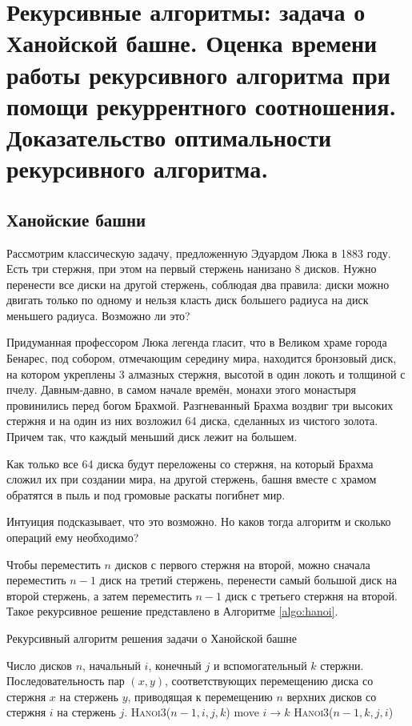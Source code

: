 \documentclass[a4paper,12pt]{article}
\begin{document}
\tableofcontents

\newpage

\section{Рекурсивные алгоритмы: задача о Ханойской башне. Оценка времени работы рекурсивного алгоритма при помощи рекуррентного соотношения. Доказательство оптимальности рекурсивного алгоритма.}

\subsection{Ханойские башни}
Рассмотрим классическую задачу, предложенную Эдуардом Люка в 1883 году. Есть три стержня, при этом на первый стержень нанизано 8 дисков. Нужно перенести все диски на другой стержень, соблюдая два правила: диски можно двигать только по одному и нельзя класть
диск большего радиуса на диск меньшего радиуса. Возможно ли это?

Придуманная профессором Люка легенда гласит, что в Великом храме города Бенарес, под собором, отмечающим середину мира, находится бронзовый диск, на котором укреплены 3 алмазных стержня, высотой в один локоть и толщиной с пчелу. Давным-давно, в самом начале времён, монахи этого монастыря провинились перед богом Брахмой. Разгневанный Брахма воздвиг три высоких стержня и на один из них возложил 64 диска, сделанных из чистого золота. Причем так, что каждый меньший диск лежит на большем.

Как только все 64 диска будут переложены со стержня, на который Брахма сложил их при создании мира, на другой стержень, башня вместе с храмом обратятся в пыль и под громовые раскаты погибнет мир.

Интуиция подсказывает, что это возможно. Но каков тогда алгоритм и сколько операций ему необходимо?

Чтобы переместить $n$ дисков с первого стержня на второй, можно сначала переместить $n - 1$ диск на третий стержень, перенести самый большой диск на второй стержень, а затем переместить $n - 1$ диск с третьего стержня на второй. Такое рекурсивное решение представлено в Алгоритме \ref{algo:hanoi}.

\begin{algorithm}[H]
	\caption{Рекурсивный алгоритм решения задачи о Ханойской башне}
	\label{algo:hanoi}
	\begin{algorithmic}[1]
		\Require Число дисков $n$, начальный $i$, конечный $j$ и вспомогательный $k$ стержни.
		\Ensure Последовательность пар $(x, y)$, соответствующих перемещению диска со стержня $x$ на стержень $y$, приводящая к перемещению $n$ верхних дисков со стержня $i$ на стержень $j$.
				\State \textsc{Hanoi3}($n-1,i,j,k$)
				\State move $i \to k$
				\State \textsc{Hanoi3}($n-1,k,j,i$)
			\EndIf
		\EndFunction
	\end{algorithmic}
\end{algorithm}
\end{document}
